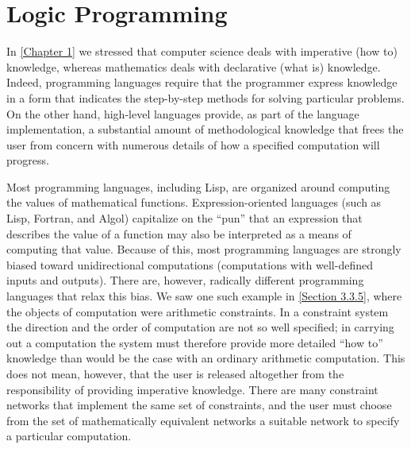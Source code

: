 \section{Logic Programming}
\label{Section 4.4}

In \cref{Chapter 1} we stressed that computer science deals with imperative (how to) knowledge, whereas mathematics deals with declarative (what is) knowledge.
Indeed, programming languages require that the programmer express knowledge in a form that indicates the step-by-step methods for solving particular problems.
On the other hand, high-level languages provide, as part of the language implementation, a substantial amount of methodological knowledge that frees the user from concern with numerous details of how a specified computation will progress.

Most programming languages, including Lisp, are organized around computing the values of mathematical functions.
Expression-oriented languages (such as Lisp, Fortran, and Algol) capitalize on the “pun” that an expression that describes the value of a function may also be interpreted as a means of computing that value.
Because of this, most programming languages are strongly biased toward unidirectional computations (computations with well-defined inputs and outputs).
There are, however, radically different programming languages that relax this bias.
We saw one such example in \cref{Section 3.3.5}, where the objects of computation were arithmetic constraints.
In a constraint system the direction and the order of computation are not so well specified;
in carrying out a computation the system must therefore provide more detailed “how to” knowledge than would be the case with an ordinary arithmetic computation.
This does not mean, however, that the user is released altogether from the responsibility of providing imperative knowledge.
There are many constraint networks that implement the same set of constraints, and the user must choose from the set of mathematically equivalent networks a suitable network to specify a particular computation.

